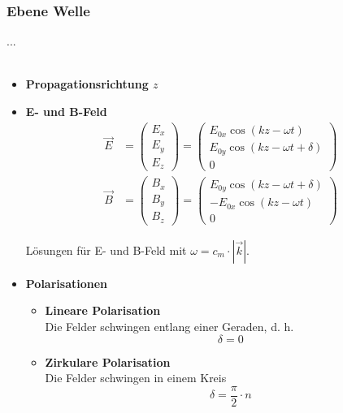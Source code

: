 \documentclass{article}
\begin{document}
\newpage


\subsubsection{Ebene Welle}
...\\
\\
	\begin{itemize}
		\item \textbf{Propagationsrichtung $z$}
	\end{itemize}


\begin{itemize}
	\item \textbf{E- und B-Feld}
		\begin{align}
			\vec{E} &=
			\begin{pmatrix}
				E_x \\ E_y \\ E_z
			\end{pmatrix}
			=
			\begin{pmatrix}
				E_{0x} \cos(k z - \omega t) \\
				E_{0y} \cos(k z - \omega t + \delta) \\
				0
			\end{pmatrix} \\
			\vec{B} &=
			\begin{pmatrix}
				B_x \\ B_y \\ B_z
			\end{pmatrix}
			=
			\begin{pmatrix}
				E_{0y} \cos(k z - \omega t + \delta) \\
				-E_{0x} \cos(k z - \omega t) \\
				0
			\end{pmatrix}	
		\end{align}
	
	Lösungen für E- und B-Feld mit $\omega = c_m \cdot |\vec{k}|$.


		\item \textbf{Polarisationen}
			\begin{itemize}
				\item \textbf{Lineare Polarisation}\\
				Die Felder schwingen entlang einer Geraden, d. h.
					\begin{equation}
						\delta = 0
					\end{equation}
					
				
				\item \textbf{Zirkulare Polarisation}\\
				Die Felder schwingen in einem Kreis
					\begin{equation}
						\delta = \frac{\pi}{2}\cdot n
					\end{equation}
				

\end{itemize}
\end{itemize}
\end{document}
